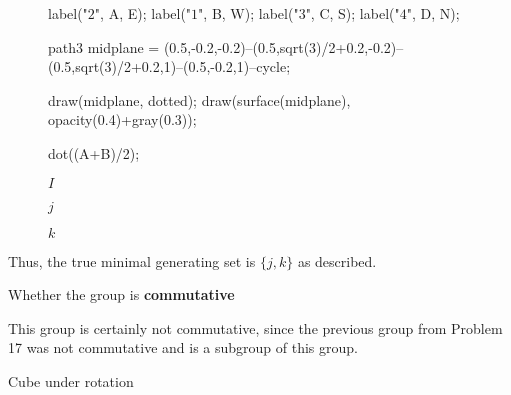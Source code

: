 \documentclass[../key.tex]{subfiles}
\begin{document}
\begin{figure}[h]
\begin{center}
\begin{minipage}{0.3\textwidth}
\begin{asy}[width=0.9\textwidth]
			label("$2$", A, E);
			label("$1$", B, W);
			label("$3$", C, S);
			label("$4$", D, N);
			
			path3 midplane = (0.5,-0.2,-0.2)--(0.5,sqrt(3)/2+0.2,-0.2)--(0.5,sqrt(3)/2+0.2,1)--(0.5,-0.2,1)--cycle;
			
			draw(midplane, dotted);
			draw(surface(midplane), opacity(0.4)+gray(0.3));
			
			dot((A+B)/2);
			\end{asy}
		\end{minipage}
	\end{center}
	\vspace*{-2\baselineskip}
	\begin{center}
		\begin{minipage}[t]{0.3\textwidth}
			\centering
			$I$
		\end{minipage}
		\hfill
		\begin{minipage}[t]{0.3\textwidth}
			\centering
			$j$
		\end{minipage}
		\hfill
		\begin{minipage}[t]{0.3\textwidth}
			\centering
			$k$
		\end{minipage}
	\end{center}
	\vspace*{-2\baselineskip}
	\begin{center}
		\begin{minipage}[t]{\textwidth}
		\end{minipage}
	\end{center}
	\vspace*{-2\baselineskip}
\end{figure}

\noindent Thus, the true minimal generating set is $\{j,k\}$ as described.

\begin{inner_problem}
\item Whether the group is \textbf{commutative}
\end{inner_problem}

\noindent This group is certainly not commutative, since the previous group from Problem 17 was not commutative and is a subgroup of this group.

\begin{outer_problem}
\item Cube under rotation
\end{outer_problem}
\end{document}
